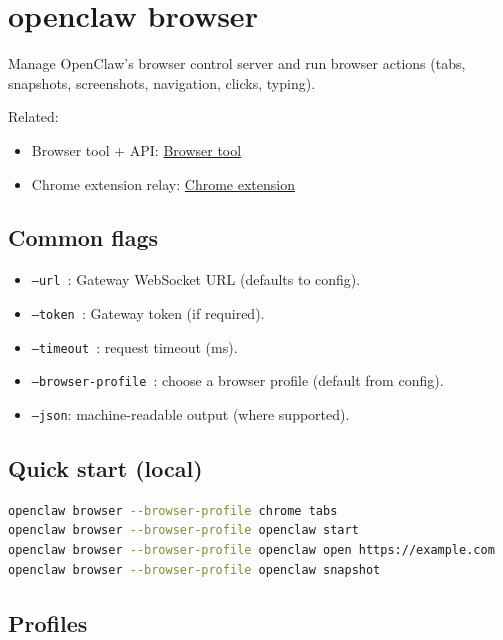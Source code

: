 \clearpage

\section{openclaw browser}


Manage OpenClaw’s browser control server and run browser actions (tabs, snapshots, screenshots, navigation, clicks, typing).

Related:

\begin{itemize}
  \item Browser tool + API: \href{/tools/browser}{Browser tool}
  \item Chrome extension relay: \href{/tools/chrome-extension}{Chrome extension}
\end{itemize}


\subsection{Common flags}


\begin{itemize}
  \item \texttt{--url }: Gateway WebSocket URL (defaults to config).
  \item \texttt{--token }: Gateway token (if required).
  \item \texttt{--timeout }: request timeout (ms).
  \item \texttt{--browser-profile }: choose a browser profile (default from config).
  \item \texttt{--json}: machine-readable output (where supported).
\end{itemize}


\subsection{Quick start (local)}


\begin{lstlisting}[language=bash]
openclaw browser --browser-profile chrome tabs
openclaw browser --browser-profile openclaw start
openclaw browser --browser-profile openclaw open https://example.com
openclaw browser --browser-profile openclaw snapshot
\end{lstlisting}


\subsection{Profiles}


